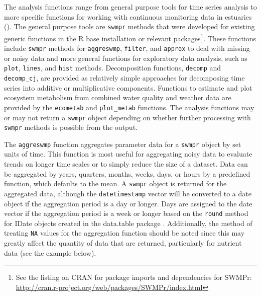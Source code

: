 \documentclass[10pt,letterpaper]{article}\usepackage[]{graphicx}\usepackage[]{color}
\begin{document}
The analysis functions range from general purpose tools for time series analysis to more specific functions for working with continuous monitoring data in estuaries ().  The general purpose tools are \texttt{swmpr} methods that were developed for existing generic functions in the R base installation or relevant packages\footnote{See the listing on \ac{CRAN} for package imports and dependencies for SWMPr: \url{http://cran.r-project.org/web/packages/SWMPr/index.html}}.  These functions include \texttt{swmpr} methods for \texttt{aggreswmp}, \texttt{filter}, and \texttt{approx} to deal with missing or noisy data and more general functions for exploratory data analysis, such as \texttt{plot}, \texttt{lines}, and \texttt{hist} methods.  Decomposition functions, \texttt{decomp} and \texttt{decomp\_cj}, are provided as relatively simple approaches for decomposing time series into additive or multiplicative components. Functions to estimate and plot ecosystem metabolism from combined water quality and weather data are provided by the \texttt{ecometab} and \texttt{plot\_metab} functions.  The analysis functions may or may not return a \texttt{swmpr} object depending on whether further processing with \texttt{swmpr} methods is possible from the output.    

The \texttt{aggreswmp} function aggregates parameter data for a \texttt{swmpr} object by set units of time.  This function is most useful for aggregating noisy data to evaluate trends on longer time scales or to simply reduce the size of a dataset.  Data can be aggregated by years, quarters, months, weeks, days, or hours by a predefined function, which defaults to the mean.  A \texttt{swmpr} object is returned for the aggregated data, although the \texttt{datetimestamp} vector will be converted to a date object if the aggregation period is a day or longer.  Days are assigned to the date vector if the aggregation period is a week or longer based on the \texttt{round} method for IDate objects created in the data.table package \cite{Dowle14}.  Additionally, the method of treating \texttt{NA} values for the aggregation function should be noted since this may greatly affect the quantity of data that are returned, particularly for nutrient data (see the example below).
\end{document}
